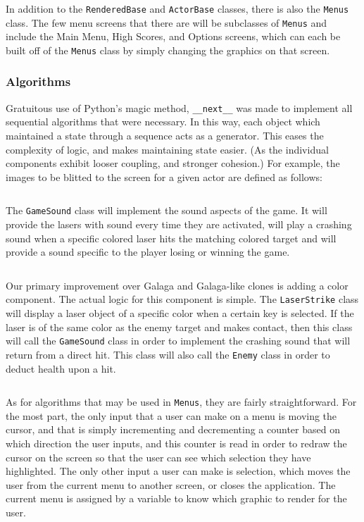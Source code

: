 
In addition to the \texttt{RenderedBase} and
\texttt{ActorBase} classes, there is also the
\texttt{Menus} class. The few menu screens that there are
will be subclasses of \texttt{Menus} and include the Main
Menu, High Scores, and Options screens, which can each be built off of
the \texttt{Menus} class by simply changing the graphics
on that screen.

\subsubsection*{Algorithms}

Gratuitous use of Python's magic method, \texttt{__next__}
was made to implement all sequential algorithms that were necessary.
In this way, each object which maintained a state through a sequence
acts as a generator.  This eases the complexity of logic, and makes
maintaining state easier. (As the individual components exhibit looser
coupling, and stronger cohesion.)  For example, the images to be blitted
to the screen for a given actor are defined as follows:

\inputminted[baselinestretch=1]{python}{../code/RenderedBase.py}

The \texttt{GameSound} class will implement the sound
aspects of the game.  It will provide the lasers with sound every
time they are activated, will play a crashing sound when a specific
colored laser hits the matching colored target and will provide a
sound specific to the player losing or winning the game.

\inputminted[baselinestretch=1]{python}{../code/GameSound.py}

Our primary improvement over Galaga and Galaga-like clones is
adding a color component.  The actual logic for this component
is simple.  The \texttt{LaserStrike} class will display a
laser object of a specific color when a certain key is selected. If
the laser is of the same color as the enemy target and makes contact,
then this class will call the \texttt{GameSound} class
in order to implement the crashing sound that will return from a
direct hit. This class will also call the \texttt{Enemy}
class in order to deduct health upon a hit.

\inputminted[baselinestretch=1]{python}{../code/LaserStrike.py}

As for algorithms that may be used in \texttt{Menus}, they
are fairly straightforward. For the most part, the only input that a
user can make on a menu is moving the cursor, and that is simply
incrementing and decrementing a counter based on which direction the
user inputs, and this counter is read in order to redraw the cursor on
the screen so that the user can see which selection they have highlighted.
The only other input a user can make is selection, which moves the user
from the current menu to another screen, or closes the application. The
current menu is assigned by a variable to know which graphic to render for
the user.
